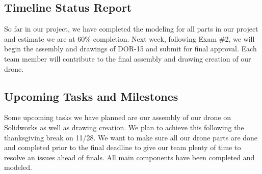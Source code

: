 
\subsection{Timeline Status Report}
    So far in our project, we have completed the modeling for all parts in our project and estimate we are at 60\% completion. Next week, following Exam \#2, we will begin the assembly and drawings of DOR-15 and submit for final approval. Each team member will contribute to the final assembly and drawing creation of our drone.\par

\subsection{Upcoming Tasks and Milestones}


    Some upcoming tasks we have planned are our assembly of our drone on Solidworks as well as drawing creation. We plan to achieve this following the thanksgiving break on 11/28. We want to make sure all our drone parts are done and completed prior to the final deadline to give our team plenty of time to resolve an issues ahead of finals. All main components have been completed and modeled.

